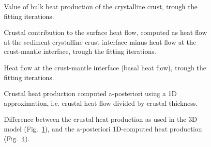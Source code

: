 \begin{subappendices}
\FloatBarrier

\begin{figure}
	\begin{adjustbox}{center}
	\end{adjustbox}
	\caption[Bulk heat production of the crystalline crust, all iterations.]{Value of bulk heat production of the crystalline crust, trough the fitting iterations.}
	\label{fig:AITN_ACC}
\end{figure}

\begin{figure}
	\begin{adjustbox}{center}
	\end{adjustbox}
	\caption[Crustal contribution to the surface heat flow, all iterations.]{Crustal contribution to the surface heat flow, computed as heat flow at the sediment-crystalline crust interface minus heat flow at the crust-mantle interface, trough the fitting iterations.}
	\label{fig:AITN_Qc}
\end{figure}

\begin{figure}
	\begin{adjustbox}{center}
	\end{adjustbox}
	\caption[Basal heat flow, all iterations.]{Heat flow at the crust-mantle interface (basal heat flow), trough the fitting iterations.}
	\label{fig:AITN_Qm}
\end{figure}

\begin{figure}
	\begin{adjustbox}{center}
	\end{adjustbox}
	\caption[Crustal heat production computed a-posteriori, using a 1D approximation.]{Crustal heat production computed a-posteriori using a 1D approximation, i.e. crustal heat flow divided by crustal thickness.}
	\label{fig:AITN_A1D}
\end{figure}

\begin{figure}
	\begin{adjustbox}{center}
	\end{adjustbox}
	\caption[Difference between the model RHP and the 1D-approximation.]{Difference between the crustal heat production as used in the 3D model (Fig.~\ref{fig:AITN_ACC}), and the a-posteriori 1D-computed heat production (Fig.~\ref{fig:AITN_A1D}).}
	\label{fig:AITN_DAC}
\end{figure}


\end{subappendices}
